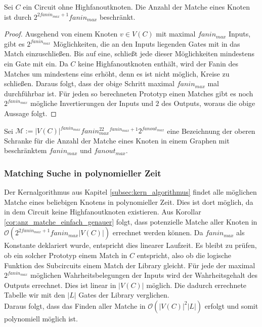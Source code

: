 \documentclass[11pt, a4paper, german]{article}
\begin{document}
\begin{cor}\label{cor:anz_matche_einfach_genauer}
Sei $C$ ein Circuit ohne Highfanoutknoten. Die Anzahl der Matche eines Knoten ist durch $2^{2fanin_{max} +1}fanin_{max}$ beschränkt.
\end{cor}
\begin{proof}
Ausgehend von einem Knoten $v \in V(C)$ mit maximal $fanin_{max}$ Inputs, gibt es  $2^{fanin_{max}}$ Möglichkeiten, die an den Inputs liegenden Gates mit in das Match einzuschließen. Bis auf eine, schließt jede dieser Möglichkeiten mindestens ein Gate mit ein. Da $C$ keine Highfanoutknoten enthält, wird der Fanin des Matches um mindestens eins erhöht, denn es ist nicht möglich, Kreise zu schließen. Daraus folgt, dass der obige Schritt maximal $fanin_{max}$ mal durchführbar ist. Für jeden so berechneten Prototyp einen Matches gibt es noch $2^{fanin_{max}}$ mögliche Invertierungen der Inputs und $2$ des Outputs, woraus die obige Aussage folgt.
\end{proof}
\begin{definition}
Sei $\mathcal{M}:= |V(C)|^{fanin_{max}} fanin_{max}^22^{fanin_{max}+1}2^{fanout_{max}}$ eine Bezeichnung der oberen Schranke für die Anzahl der Matche eines Knoten in einem Graphen mit beschränktem $fanin_{max}$ und $fanout_{max}$.
\end{definition}

\subsubsection{Matching Suche in polynomieller Zeit}
Der Kernalgorithmus aus Kapitel \ref{subsec:kern_algorithmus} findet alle möglichen Matche eines beliebigen Knotens in polynomieller Zeit. Dies ist dort möglich, da in dem Circuit keine Highfanoutknoten existieren. Aus Korollar \ref{cor:anz_matche_einfach_genauer} folgt, dass potenzielle Matche aller Knoten  in $\mathcal{O}(2^{2fanin_{max} +1}fanin_{max} |V(C)|)$ errechnet werden können. Da $fanin_{max}$ als Konstante deklariert wurde, entspricht dies linearer Laufzeit. Es bleibt zu prüfen, ob  ein solcher Prototyp einem Match in $C$ entspricht, also ob die logische Funktion des Subcircuits einem Match der Library gleicht. Für jede der maximal $2^{fanin_{max}}$ möglichen Wahrheitsbelegungen der Inputs wird der Wahrheitsgehalt des Outputs errechnet. Dies ist linear in $|V(C)|$ möglich. Die dadurch errechnete Tabelle wir mit den $|L|$ Gates der Library verglichen. \\
Daraus folgt, dass das Finden aller Matche in $\mathcal{O}(|V(C)|^2|L|)$ erfolgt und somit polynomiell möglich ist.
\end{document}
